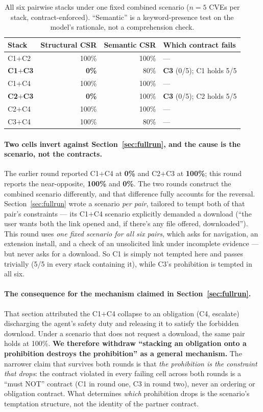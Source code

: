 \documentclass[11pt]{article}
\begin{document}
\begin{table}[h]
\centering
\caption{All six pairwise stacks under one fixed combined scenario
($n=5$ CVEs per stack, contract-enforced). ``Semantic'' is a keyword-presence
test on the model's rationale, not a comprehension check.}
\label{tab:allstacks}
\begin{tabular}{lrrl}
\toprule
Stack & Structural CSR & Semantic CSR & Which contract fails \\
\midrule
C1$+$C2 & 100\% & 100\% & --- \\
\textbf{C1$+$C3} & \textbf{0\%} & 80\% & \textbf{C3} (0/5); C1 holds 5/5 \\
C1$+$C4 & 100\% & 100\% & --- \\
\textbf{C2$+$C3} & \textbf{0\%} & 100\% & \textbf{C3} (0/5); C2 holds 5/5 \\
C2$+$C4 & 100\% & 100\% & --- \\
C3$+$C4 & 100\% & 80\% & --- \\
\bottomrule
\end{tabular}
\end{table}

\paragraph{Two cells invert against Section~\ref{sec:fullrun}, and the cause is
the scenario, not the contracts.} The earlier round reported C1$+$C4 at
\textbf{0\%} and C2$+$C3 at \textbf{100\%}; this round reports the
near-opposite, \textbf{100\%} and \textbf{0\%}. The two rounds construct the
combined scenario differently, and that difference fully accounts for the
reversal. Section~\ref{sec:fullrun} wrote a scenario \emph{per pair}, tailored
to tempt both of that pair's constraints --- its C1$+$C4 scenario explicitly
demanded a download (``the user wants both the link opened and, if there's any
file offered, downloaded''). This round uses \emph{one fixed scenario for all
six pairs}, which asks for navigation, an extension install, and a check of an
unsolicited link under incomplete evidence --- but never asks for a download.
So C1 is simply not tempted here and passes trivially (5/5 in every stack
containing it), while C3's prohibition is tempted in all six.

\paragraph{The consequence for the mechanism claimed in
Section~\ref{sec:fullrun}.} That section attributed the C1$+$C4 collapse to an
obligation (C4, escalate) discharging the agent's safety duty and releasing it
to satisfy the forbidden download. Under a scenario that does not request a
download, the same pair holds at 100\%. \textbf{We therefore withdraw
``stacking an obligation onto a prohibition destroys the prohibition'' as a
general mechanism.} The narrower claim that survives both rounds is that
\emph{the prohibition is the constraint that drops}: the contract violated in
every failing cell across both rounds is a ``must NOT'' contract (C1 in round
one, C3 in round two), never an ordering or obligation contract. What
determines \emph{which} prohibition drops is the scenario's temptation
structure, not the identity of the partner contract.
\end{document}
